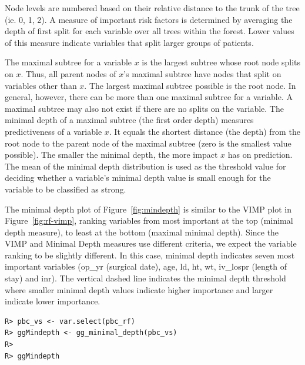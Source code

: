 \documentclass[nojss]{jss}
\begin{document}
Node levels are numbered based on their relative distance to the trunk of the tree (ie. 0, 1, 2).  A measure of important risk factors is determined by averaging the depth of first split for each variable over all trees within the forest. Lower values of this measure indicate variables that split larger groups of patients. 

The maximal subtree for a variable $x$ is the largest subtree whose root node splits on $x$. Thus, all parent nodes of $x$'s maximal subtree have nodes that split on variables other than $x$. The largest maximal subtree possible is the root node. In general, however, there can be more than one maximal subtree for a variable. A maximal subtree may also not exist if there are no splits on the variable. The minimal depth of a maximal subtree (the first order depth) measures predictiveness of a variable $x$. It equals the shortest distance (the depth) from the root node to the parent node of the maximal subtree (zero is the smallest value possible). The smaller the minimal depth, the more impact $x$ has on prediction. The mean of the minimal depth distribution is used as the threshold value for deciding whether a variable's minimal depth value is small enough for the variable to be classified as strong. 

The minimal depth plot of Figure~\ref{fig:mindepth} is similar to the VIMP plot in Figure~\ref{fig:rf-vimp}, ranking variables from most important at the top (minimal depth measure), to least at the bottom (maximal minimal depth). Since the VIMP and Minimal Depth measures use different criteria, we expect the variable ranking to be slightly different. In this case, minimal depth indicates seven most important variables (op\_yr (surgical date), age, ld, ht, wt, iv\_lospr (length of stay) and inr). The vertical dashed line indicates the minimal depth threshold where smaller minimal depth values indicate higher importance and larger indicate lower importance.


\begin{knitrout}\footnotesize
{}\color{fgcolor}\begin{kframe}
\begin{verbatim}
R> pbc_vs <- var.select(pbc_rf)
R> ggMindepth <- gg_minimal_depth(pbc_vs)
R> 
R> ggMindepth
\end{verbatim}
\end{kframe}
\end{knitrout}
\end{document}
